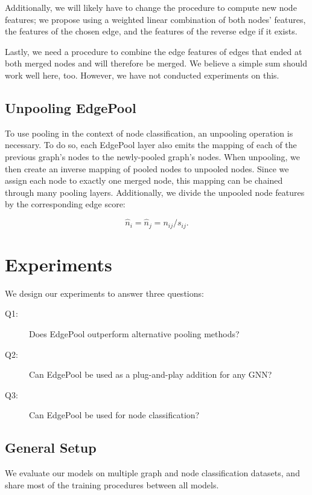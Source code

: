 \documentclass{article}
\newcommand{\edgepool}{EdgePool}
\begin{document}
Additionally, we will likely have to change the procedure to compute new node features; we propose using a weighted linear combination of both nodes' features, the features of the chosen edge, and the features of the reverse edge if it exists.

Lastly, we need a procedure to combine the edge features of edges that ended at both merged nodes and will therefore be merged. We believe a simple sum should work well here, too. However, we have not conducted experiments on this.


\subsection{Unpooling \edgepool{}}

To use pooling in the context of node classification, an unpooling operation is necessary. To do so, each \edgepool{} layer also emits the mapping of each of the previous graph's nodes to the newly-pooled graph's nodes. When unpooling, we then create an inverse mapping of pooled nodes to unpooled nodes. Since we assign each node to exactly one merged node, this mapping can be chained through many pooling layers. Additionally, we divide the unpooled node features by the corresponding edge score:

\begin{equation}
	\hat{n}_{i} = \hat{n}_{j} = n_{ij} / s_{ij}.
\end{equation} 
\section{Experiments}
\label{sec:experiments}

We design our experiments to answer three questions:

\begin{description}
	\item[Q1:] Does \edgepool{} outperform alternative pooling methods?
	\item[Q2:] Can \edgepool{} be used as a plug-and-play addition for any \gls{GNN}?
	\item[Q3:] Can \edgepool{} be used for node classification?
\end{description}

\subsection{General Setup}

We evaluate our models on multiple graph and node classification datasets, and share most of the training procedures between all models.
\end{document}
